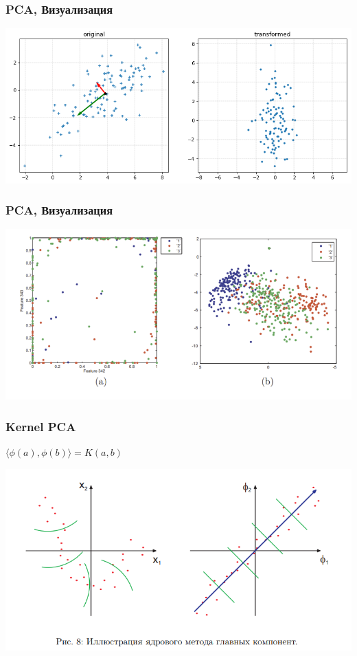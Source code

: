 \documentclass[14pt]{beamer}
\begin{document}
\begin{frame}
\frametitle{PCA, Визуализация}
	\includegraphics[width=\linewidth]{pca.png}
\end{frame}
\begin{frame}
\frametitle{PCA, Визуализация}
	\includegraphics[width=\linewidth]{pca2.png}
\end{frame}

\begin{frame}
\frametitle{Kernel PCA}
	\vspace{-4pt}
	\begin{center}
	$\langle \phi(a),\phi(b) \rangle = K(a,b)$
	\end{center}
	\includegraphics[width=\linewidth]{kerpca.png}
\end{frame}
\end{document}
